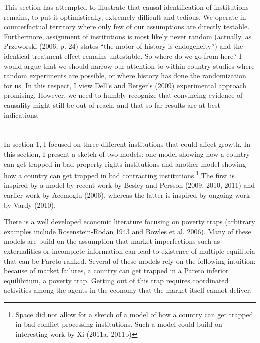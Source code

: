 \documentclass[12pt]{article}%
\begin{document}
This section has attempted to illustrate that causal identification of institutions remains, to put it optimistically, extremely difficult and tedious. We operate in counterfactual territory where only few of our assumptions are directly testable. Furthermore, assignment of institutions is most likely never random (actually, as Przeworski (2006, p. 24) states ``the motor of history is endogeneity'') and the identical treatment effect remains untestable. So where do we go from here? I would argue that we should narrow our attention to within country studies where random experiments are possible, or where history has done the randomization for us. In this respect, I view Dell's and Berger's (2009) experimental approach promising. However, we need to humbly recognize that convincing evidence of causality might still be out of reach, and that so far results are at best indications. 

\section{}
In section 1, I focused on three different institutions that could affect growth. In this section, I present a sketch of two models: one model showing how a country can get trapped in bad property rights institutions and another model showing how a country can get trapped in bad contracting institutions.\footnote{Space did not allow for a sketch of a model of how a country can get trapped in bad conflict processing institutions. Such a model could build on interesting work by Xi (2011a, 2011b)} The first is inspired by a model by recent work by Besley and Persson (2009, 2010, 2011) and earlier work by Acemoglu (2006), whereas the latter is inspired by ongoing work by Vardy (2010). 

There is a well developed economic literature focusing on poverty traps (arbitrary examples include Rosenstein-Rodan 1943 and Bowles et al. 2006). Many of these models are build on the assumption that market imperfections such as externalities or incomplete information can lead to existence of multiple equilibria that can be Pareto-ranked. Several of these models rely on the following intuition: because of market failures, a country can get trapped in a Pareto inferior equilibrium, a poverty trap. Getting out of this trap requires coordinated activities among the agents in the economy that the market itself cannot deliver. 
\end{document}
